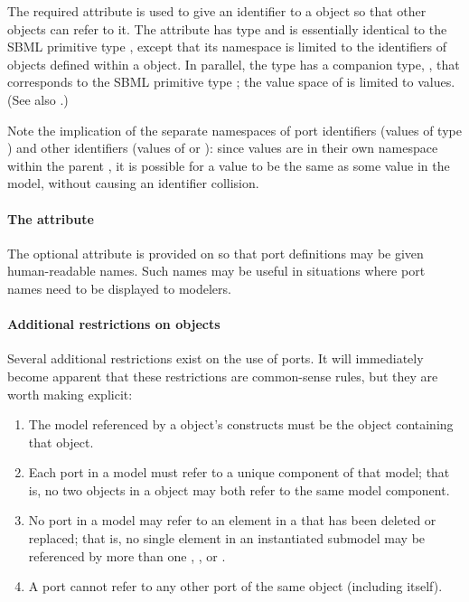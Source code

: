 The required attribute  is used to give an identifier to a \Port object so that other objects can refer to it.  The attribute has type  and is essentially identical to the SBML primitive type , except that its namespace is limited to the identifiers of \Port objects defined within a \Model object.  In parallel, the  type has a companion type, , that corresponds to the SBML primitive type ; the value space of  is limited to  values.  (See also .)

Note the implication of the separate namespaces of port identifiers (values of type ) and other identifiers (values of  or ): since  values are in their own namespace within the parent \Model, it is possible for a  value to be the same as some  value in the model, without causing an identifier collision.


\paragraph{The \fixttspace{} attribute}

The optional  attribute is provided on \Port so that port definitions may be given human-readable names.  Such names may be useful in situations where port names need to be displayed to modelers.


\paragraph{Additional restrictions on  objects}

Several additional restrictions exist on the use of ports.  It will immediately become apparent that these restrictions are common-sense rules, but they are worth making explicit:

\begin{enumerate}

  \item The model referenced by a \Port object's \SBaseRef constructs must be the \Model object containing that \Port object.

  \item Each port in a model must refer to a unique component of that model; that is, no two \Port objects in a \Model object may both refer to the same model component.

  \item No port in a model may refer to an element in a \Submodel  that has been deleted or replaced; that is, no single element  in an instantiated submodel may be referenced by more than one \Port, \ReplacedElement, or \Deletion.

  \item A port cannot refer to any other port of the same \Model object (including itself).

\end{enumerate}
 
